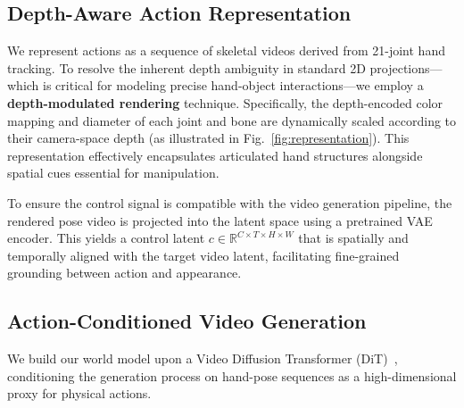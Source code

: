 \subsection{Depth-Aware Action Representation}
\label{sec:method:rep}
We represent actions as a sequence of skeletal videos derived from 21-joint hand tracking. To resolve the inherent depth ambiguity in standard 2D projections---which is critical for modeling precise hand-object interactions---we employ a \textbf{depth-modulated rendering} technique. Specifically, the depth-encoded color mapping and diameter of each joint and bone are dynamically scaled according to their camera-space depth (as illustrated in Fig.~\ref{fig:representation}). This representation effectively encapsulates articulated hand structures alongside spatial cues essential for manipulation. 

To ensure the control signal is compatible with the video generation pipeline, the rendered pose video is projected into the latent space using a pretrained VAE encoder. This yields a control latent $c \in \mathbb{R}^{C \times T \times H \times W}$ that is spatially and temporally aligned with the target video latent, facilitating fine-grained grounding between action and appearance.


\subsection{Action-Conditioned Video Generation}
\label{sec:method:hands}
We build our world model upon a Video Diffusion Transformer (DiT)~\citep{wang2025wan}, conditioning the generation process on hand-pose sequences as a high-dimensional proxy for physical actions.

